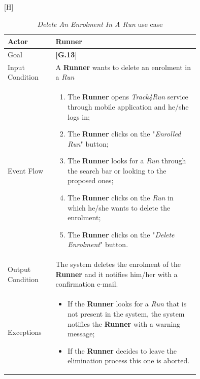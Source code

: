 \begin{center}[H]
\begin{table}
\begin{tabular}{ | l | p{0.75\linewidth} | }
  \hline
    Actor & \textbf{Runner} \\ \hline
    Goal & \textbf{[G.13]} \\ \hline
    Input Condition & A \textbf{Runner} wants to delete an enrolment in a \textit{Run} \\ \hline
    Event Flow & \begin{minipage}[t]{0.7\textwidth}
      \begin{enumerate}
        \item The \textbf{Runner} opens \textit{Track4Run} service through mobile application and he/she logs in;
        \item The \textbf{Runner} clicks on the "\textit{Enrolled Run}" button;
        \item The \textbf{Runner} looks for a \textit{Run} through the search bar or looking to the proposed ones;
        \item The \textbf{Runner} clicks on the \textit{Run} in which he/she wants to delete the enrolment;
        \item The \textbf{Runner} clicks on the "\textit{Delete Enrolment}" button.
      \end{enumerate}
    \smallskip
  \end{minipage} \\ \hline
  Output Condition & The system deletes the enrolment of the \textbf{Runner} and it notifies him/her with a confirmation e-mail. \\ \hline
  Exceptions & \begin{minipage}[t]{0.7\textwidth}
    \begin{itemize}
      \smallskip
      \item If the \textbf{Runner} looks for a \textit{Run} that is not present in the system, the system notifies the \textbf{Runner} with a warning message;
      \item If the \textbf{Runner} decides to leave the elimination process this one is aborted.
    \end{itemize}
    \smallskip
  \end{minipage}  \\ \hline
\end{tabular}
\caption{\textit{Delete An Enrolment In A Run} use case}
\label{table:deleteEnrolmentTable}
\end{table}
\end{center}

